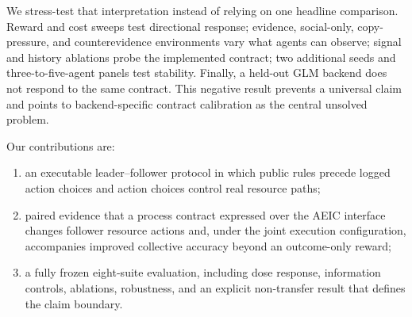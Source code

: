 We stress-test that interpretation instead of relying on one headline comparison. Reward and cost sweeps test directional response; evidence, social-only, copy-pressure, and counterevidence environments vary what agents can observe; signal and history ablations probe the implemented contract; two additional seeds and three-to-five-agent panels test stability. Finally, a held-out GLM backend does not respond to the same contract. This negative result prevents a universal claim and points to backend-specific contract calibration as the central unsolved problem.

Our contributions are:
\begin{enumerate}
 \item an executable leader--follower protocol in which public rules precede logged action choices and action choices control real resource paths;
 \item paired evidence that a process contract expressed over the AEIC interface changes follower resource actions and, under the joint execution configuration, accompanies improved collective accuracy beyond an outcome-only reward;
 \item a fully frozen eight-suite evaluation, including dose response, information controls, ablations, robustness, and an explicit non-transfer result that defines the claim boundary.
\end{enumerate}
